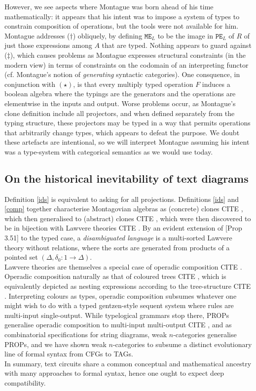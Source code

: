 However, we see aspects where Montague was born ahead of his time mathematically: it appears that his intent was to impose a system of types to constrain composition of operations, but the tools were not available for him. Montague addresses ($\dag$) obliquely, by defining $\texttt{ME}_L$ to be the image in $\texttt{PE}_L$ of $R$ of just those expressions among $A$ that are typed. Nothing appears to guard against ($\ddag$), which causes problems as Montague expresses structural constraints (in the modern view) in terms of constraints on the codomain of an interpreting functor (cf. Montague's notion of \emph{generating} syntactic categories). One consquence, in conjunction with $(\star)$, is that every multiply typed operation $F$ induces a boolean algebra where the typings are the generators and the operations are elementwise in the inputs and output. Worse problems occur, as Montague's clone definition include all projectors, and when defined separately from the typing structure, these projectors may be typed in a way that permits operations that arbitrarily change types, which appears to defeat the purpose. We doubt these artefacts are intentional, so we will interpret Montague assuming his intent was a type-system with categorical semantics as we would use today.

\subsection{On the historical inevitability of text diagrams}

Definition \ref{ids} is equivalent to asking for all projections. Definitions \ref{ids} and \ref{comp} together characterise Montagovian algebras as (concrete) clones \bR CITE \e, which then generalised to (abstract) clones \bR CITE \e, which were then discovered to be in bijection with Lawvere theories \bR CITE \e. By an evident extension of [Prop 3.51] to the typed case, a \emph{disambiguated language} is a multi-sorted Lawvere theory without relations, where the sorts are generated from products of a pointed set $(\Delta, \delta_0 : 1 \rightarrow \Delta)$.\\

Lawvere theories are themselves a special case of operadic composition \bR CITE \e. Operadic composition naturally as that of coloured trees \bR CITE \e, which is equivalently depicted as nesting expressions according to the tree-structure \bR CITE \e. Interpreting colours as types, operadic composition subsumes whatever one might wish to do with a typed gentzen-style sequent system where rules are multi-input single-output. While typelogical grammars stop there, PROPs generalise operadic composition to multi-input multi-output \bR CITE \e, and as combinatorial specifications for string diagrams, weak $n$-categories generalise PROPs, and we have shown weak $n$-categories to subsume a distinct evolutionary line of formal syntax from CFGs to TAGs.\\

In summary, text circuits share a common conceptual and mathematical ancestry with many approaches to formal syntax, hence one ought to expect deep compatibility.